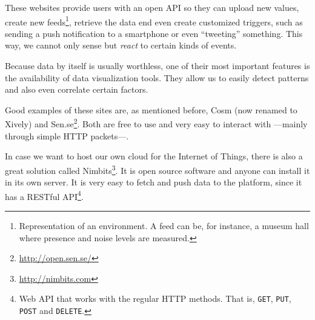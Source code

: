 These websites provide users with an open API so they can upload new values, create new feeds\footnote{Representation of an environment. A feed can be, for instance, a museum hall where presence and noise levels are measured.}, retrieve the data end even create customized triggers, such as sending a push notification to a smartphone or even ``tweeting'' something. This way, we cannot only sense but \emph{react} to certain kinds of events.

Because data by itself is usually worthless, one of their most important features is the availability of data visualization tools. They allow us to easily detect patterns and also even correlate certain factors.


Good examples of these sites are, as mentioned before, Cosm (now renamed to Xively) and Sen.se\footnote{\url{http://open.sen.se/}}. Both are free to use and very easy to interact with ---mainly through simple HTTP packets---.

In case we want to host our own cloud for the Internet of Things, there is also a great solution called Nimbits\footnote{\url{http://nimbits.com}}. It is open source software and anyone can install it in its own server. It is very easy to fetch and push data to the platform, since it has a RESTful API\footnote{Web API that works with the regular HTTP methods. That is, \texttt{GET}, \texttt{PUT}, \texttt{POST} and \texttt{DELETE}.}.

